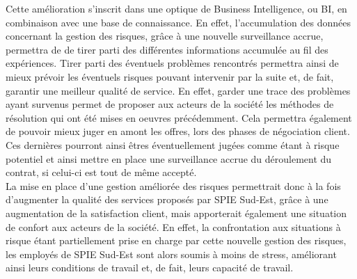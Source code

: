 Cette amélioration s’inscrit dans une optique de Business Intelligence, ou BI, en combinaison avec une base de connaissance. En effet, l’accumulation des données concernant la gestion des risques, grâce à une nouvelle surveillance accrue, permettra de de tirer parti des différentes informations accumulée au fil des expériences. Tirer parti des éventuels problèmes rencontrés permettra ainsi de mieux prévoir les éventuels risques pouvant intervenir par la suite et, de fait, garantir une meilleur qualité de service. En effet, garder une trace des problèmes ayant survenus permet de proposer aux acteurs de la société les méthodes de résolution qui ont été mises en oeuvres précédemment. Cela permettra également de pouvoir mieux juger en amont les offres, lors des phases de négociation client. Ces dernières pourront ainsi êtres éventuellement jugées comme étant à risque potentiel et ainsi mettre en place une surveillance accrue du déroulement du contrat, si celui-ci est tout de même accepté. \\

La mise en place d’une gestion améliorée des risques permettrait donc à la fois d’augmenter la qualité des services proposés par SPIE Sud-Est, grâce à une augmentation de la satisfaction client, mais apporterait également une situation de confort aux acteurs de la société. En effet, la confrontation aux situations à risque étant partiellement prise en charge par cette nouvelle gestion des risques, les employés de SPIE Sud-Est sont alors soumis à moins de stress, améliorant ainsi leurs conditions de travail et, de fait, leurs capacité de travail.
